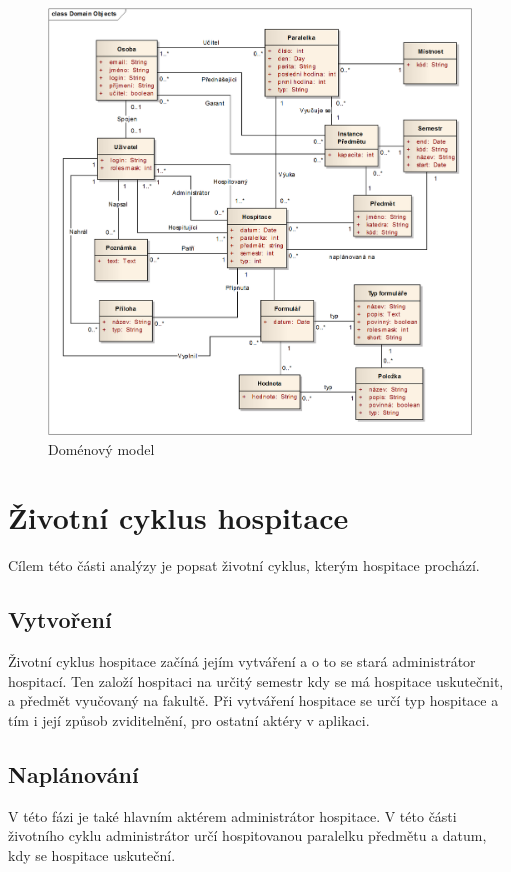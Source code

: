 \begin{figure}[p]
\begin{center}
\includegraphics[width=16cm]{figures/DomainModel}
\caption{Doménový model}
\label{fig:domainmodel}
\end{center}
\end{figure}

\section{Životní cyklus hospitace}
Cílem této části analýzy je popsat životní cyklus, kterým hospitace prochází. 

\subsection{Vytvoření}
Životní cyklus hospitace začíná jejím vytváření a o to se stará administrátor hospitací. Ten založí hospitaci na určitý semestr kdy se má hospitace uskutečnit, a předmět vyučovaný na fakultě. Při vytváření hospitace se určí typ hospitace a tím i její způsob zviditelnění, pro ostatní aktéry v aplikaci.

\subsection{Naplánování}
V této fázi je také hlavním aktérem administrátor hospitace. V této části životního cyklu administrátor určí hospitovanou paralelku předmětu a datum,  kdy se hospitace uskuteční.  

